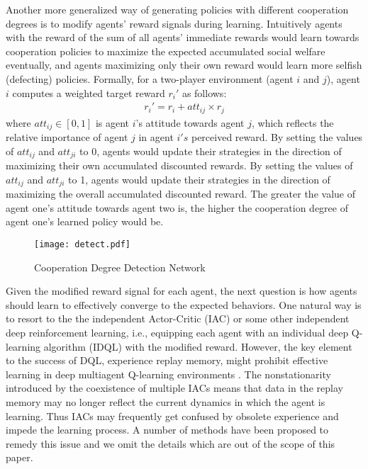 \documentclass{article}
\begin{document}
Another more generalized way of generating policies with different cooperation degrees is to modify agents' reward signals during learning. Intuitively agents with the reward of the sum of all agents' immediate rewards would learn towards cooperation policies to maximize the expected accumulated social welfare eventually, and agents maximizing only their own reward would learn more selfish (defecting) policies. Formally, for a two-player environment (agent $i$ and $j$), agent $i$ computes a weighted target reward $r_i'$ as follows:
\begin{eqnarray}
r_i' = r_i + att_{ij} \times r_j
\end{eqnarray}
where $att_{ij} \in [0,1]$ is agent $i$'s attitude towards agent $j$, which reflects the relative importance of agent $j$ in agent $i's$ perceived reward. By setting the values of $att_{ij}$ and $att_{ji}$ to 0, agents would update their strategies in the direction of maximizing their own accumulated discounted rewards. By setting the values of $att_{ij}$ and $att_{ji}$ to 1, agents would update their strategies in the direction of maximizing the overall accumulated discounted reward. The greater the value of agent one's attitude towards agent two is, the higher the cooperation degree of agent one's learned policy would be.

\begin{figure}[t]
\centering
\texttt{[image: detect.pdf]}
\caption{ Cooperation Degree Detection Network }
\label{detectionnetwork}
\end{figure}

Given the modified reward signal for each agent, the next question is how agents should learn to effectively converge to the expected behaviors. One natural way is to resort to the the independent Actor-Critic (IAC) or some other independent deep reinforcement learning, i.e., equipping each agent with an individual deep Q-learning algorithm (IDQL) with the modified reward. However, the key element to the success of DQL,  experience replay memory, might prohibit effective learning in deep multiagent Q-learning environments \cite{foerster2017stabilising,sunehag2017value}. The nonstationarity introduced by the coexistence of multiple IACs means that data in the replay memory may no longer reflect the current dynamics in which the agent is learning. Thus IACs may frequently get confused by obsolete experience and impede the learning process. A number of methods have been proposed to remedy this issue \cite{foerster2017stabilising,lowe2017multi,foerster2017counterfactual} and we omit the details which are out of the scope of this paper.
\end{document}
